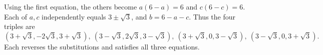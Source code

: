 Using the first equation, the others become $ a(6-a)=6 $ and $ c(6-c)=6 $. Each of $ a,c $ independently equals $ 3\pm\sqrt3 $, and $ b=6-a-c $. Thus the four triples are
\[\boxed{(3+\sqrt3,-2\sqrt3,3+\sqrt3),\ (3-\sqrt3,2\sqrt3,3-\sqrt3),\ (3+\sqrt3,0,3-\sqrt3),\ (3-\sqrt3,0,3+\sqrt3)}.\]
Each reverses the substitutions and satisfies all three equations.
